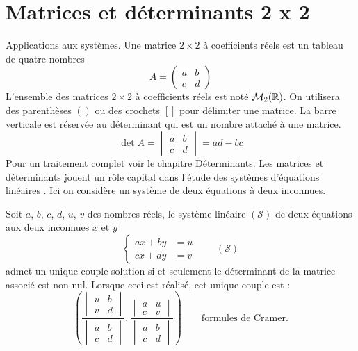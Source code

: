 \section{Matrices et déterminants 2 x 2}
 Applications aux systèmes.\newline
Une matrice $2\times2$ à coefficients réels est un tableau de quatre nombres
\begin{displaymath}
A=
 \begin{pmatrix}
  a & b \\
  c & d
 \end{pmatrix}
\end{displaymath}
L'ensemble des matrices $2\times2$ à coefficients réels est noté $\mathcal M_2(\mathbb{R})$. On utilisera des parenthèses $( )$ ou des crochets $[ ]$ pour délimiter une matrice. La barre verticale est réservée au déterminant qui est un nombre attaché à une matrice.
\begin{displaymath}
 \det A =  \begin{vmatrix}
  a & b \\
  c & d
 \end{vmatrix}
= ad -bc
\end{displaymath}
Pour un traitement complet voir le chapitre \href{\baseurl C2261.pdf}{Déterminants}.
Les matrices et déterminants jouent un rôle capital dans l'étude des systèmes d'équations linéaires . Ici on considère un système de deux équations à deux inconnues.
\begin{prop}Soit $a$, $b$, $c$, $d$, $u$, $v$ des nombres réels, le système linéaire $(\mathcal S)$ de deux équations aux deux inconnues $x$ et $y$ 
\begin{equation*}
 \left\lbrace 
\begin{aligned}
 a x + by &= u \\
 cx + dy &= v
\end{aligned}\right.  \qquad (\mathcal S)
\end{equation*}
admet un unique couple solution si et seulement le déterminant de la matrice associé est non nul. Lorsque ceci est réalisé, cet unique couple est :
\begin{displaymath}
 (\dfrac
{
\begin{vmatrix}
  u & b \\
  v & d
\end{vmatrix}
}
{
\begin{vmatrix}
  a & b \\
  c & d
\end{vmatrix}
} , 
\dfrac
{
\begin{vmatrix}
  a & u \\
  c & v
\end{vmatrix}
}
{
\begin{vmatrix}
  a & b \\
  c & d
\end{vmatrix}
}) \qquad \text{formules de Cramer}.
\end{displaymath}
\end{prop}
